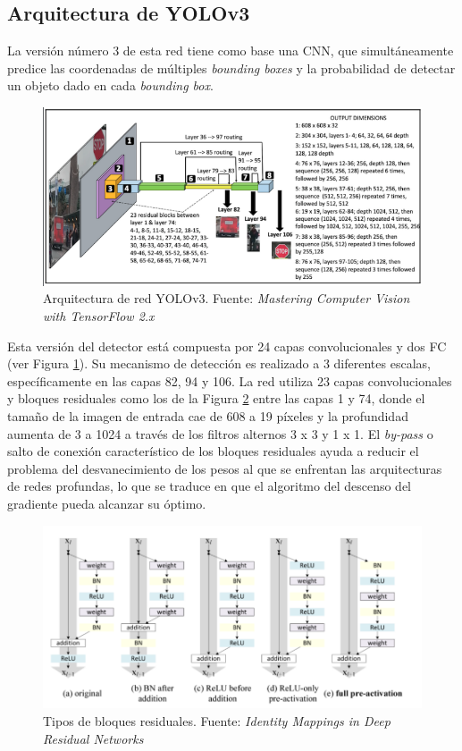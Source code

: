 \subsection{Arquitectura de YOLOv3}
La versión número 3 de esta red tiene como base una CNN, que simultáneamente predice las coordenadas de múltiples \textit{bounding boxes} y la probabilidad de detectar un objeto dado en cada \textit{bounding box}.
\begin{figure}[H]
    \centering
    \includegraphics[scale=0.8]{Recursos/yolov3_architecture.png}
    \caption[Arquitectura de red YOLOv3.]{Arquitectura de red YOLOv3. {\footnotesize Fuente: \textit{Mastering Computer Vision with TensorFlow 2.x} \cite[p~192]{Krishnendu}}}
    \label{yolov3Architecture}
\end{figure}
 Esta versión del detector está compuesta por 24 capas convolucionales y dos FC (ver Figura \ref{yolov3Architecture}). Su mecanismo de detección es realizado a 3 diferentes escalas, específicamente en las capas 82, 94 y 106. La red utiliza 23 capas convolucionales y bloques residuales como los de la Figura \ref{tipos_de_bloques_residuales} entre las capas 1 y 74, donde el tamaño de la imagen de entrada cae de 608 a 19 píxeles y la profundidad aumenta de 3 a 1024 a través de los filtros alternos 3 x 3 y 1 x 1. El \textit{by-pass} o salto de conexión característico de los bloques residuales ayuda a reducir el problema del desvanecimiento de los pesos al que se enfrentan las arquitecturas de redes profundas, lo que se traduce en que el algoritmo del descenso del gradiente pueda alcanzar su óptimo.
 \begin{figure}[H]
     \centering
     \includegraphics[scale=0.6]{Recursos/residual_block.png}
     \caption[Tipos de bloques residuales.]{Tipos de bloques residuales. {\footnotesize Fuente: \textit{Identity Mappings in Deep Residual Networks} \cite{residualBlocksPaper}}}
     \label{tipos_de_bloques_residuales}
 \end{figure}
